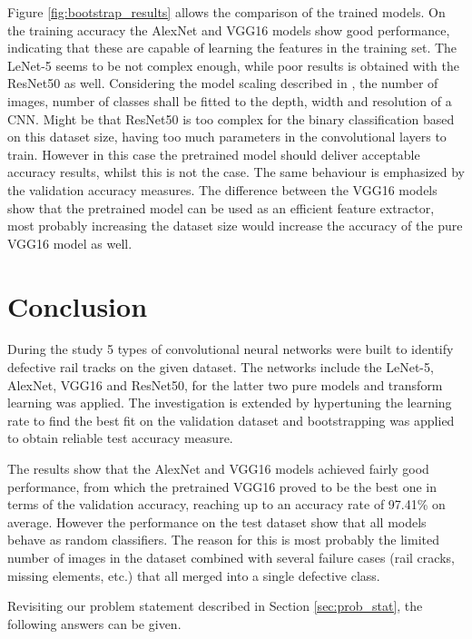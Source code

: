 \documentclass[10pt, final]{article}
\begin{document}
Figure \ref{fig:bootstrap_results} allows the comparison of the trained models.
On the training accuracy the AlexNet and VGG16 models show good performance, indicating that these are capable
of learning the features in the training set.
The LeNet-5 seems to be not complex enough, while poor results is obtained with the ResNet50 as well.
Considering the model scaling described in \cite{tan_efficientnet_2020}, the number of images, number of classes
shall be fitted to the depth, width and resolution of a CNN.
Might be that ResNet50 is too complex for the binary classification based on this dataset size, having too much
parameters in the convolutional layers to train.
However in this case the pretrained model should deliver acceptable accuracy results, whilst this is not the case.
The same behaviour is emphasized by the validation accuracy measures.
The difference between the VGG16 models show that the pretrained model can be used as an efficient feature extractor,
most probably increasing the dataset size would increase the accuracy of the pure VGG16 model as well.

\section{Conclusion} \label{sec:conclusion}
During the study 5 types of convolutional neural networks were built to identify defective rail tracks on the given dataset.
The networks include the LeNet-5, AlexNet, VGG16 and ResNet50, for the latter two pure models and transform learning was applied.
The investigation is extended by hypertuning the learning rate to find the best fit on the validation dataset and bootstrapping
was applied to obtain reliable test accuracy measure.

The results show that the AlexNet and VGG16 models achieved fairly good performance, from which the pretrained VGG16 proved to
be the best one in terms of the validation accuracy, reaching up to an accuracy rate of 97.41\% on average.
However the performance on the test dataset show that all models behave as random classifiers.
The reason for this is most probably the limited number of images in the dataset combined with several failure cases
(rail cracks, missing elements, etc.) that all merged into a single defective class.

Revisiting our problem statement described in Section \ref{sec:prob_stat}, the following answers can be given.
\end{document}
